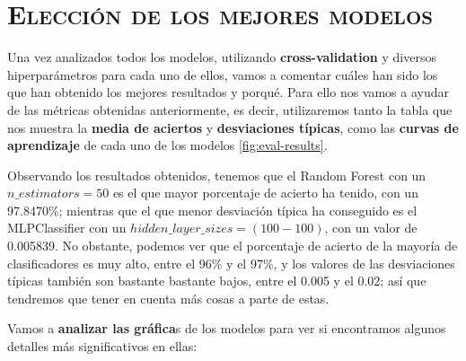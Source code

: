 \documentclass[11pt,a4paper]{article}
\begin{document}
\section{\textsc{Elección de los mejores modelos}}

Una vez analizados todos los modelos, utilizando \textbf{cross-validation} y diversos hiperparámetros para cada uno de ellos, vamos a
comentar cuáles han sido los que han obtenido los mejores resultados y porqué. Para ello nos vamos a ayudar de las métricas obtenidas
anteriormente, es decir, utilizaremos tanto la tabla que nos muestra la \textbf{media de aciertos} y \textbf{desviaciones típicas}, como
las \textbf{curvas de aprendizaje} de cada uno de los modelos \ref{fig:eval-results}.

Observando los resultados obtenidos, tenemos que el Random Forest con un $n\_estimators = 50$ es el que mayor porcentaje de acierto ha
tenido, con un 97.8470\%; mientras que el que menor desviación típica ha conseguido es el MLPClassifier con un $hidden\_layer\_sizes =
(100-100)$, con un valor de 0.005839. No obstante, podemos ver que el porcentaje de acierto de la mayoría de clasificadores es muy alto,
entre el 96\% y el 97\%, y los valores de las desviaciones típicas también son bastante bastante bajos, entre el 0.005 y el 0.02; así que
tendremos que tener en cuenta más cosas a parte de estas.

Vamos a \textbf{analizar las gráfica}s de los modelos para ver si encontramos algunos detalles más significativos en ellas:
\end{document}
